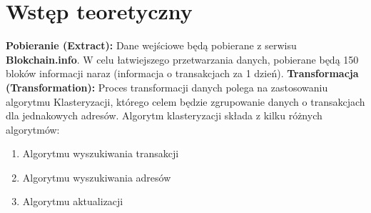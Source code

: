 \documentclass[12pt,oneside,a4paper]{book}
\begin{document}
\section{Wstęp teoretyczny}
\textbf{Pobieranie (Extract):}
\newline
Dane wejściowe będą pobierane z serwisu \textbf{Blokchain.info}.
\newline \newline
W celu łatwiejszego przetwarzania danych, pobierane będą 150 bloków informacji naraz (informacja o transakcjach za 1 dzień).
\newline \newline
\textbf{Transformacja (Transformation):}
\newline
Proces transformacji danych polega na zastosowaniu algorytmu Klasteryzacji, którego celem będzie zgrupowanie danych o transakcjach dla jednakowych adresów. Algorytm klasteryzacji składa z kilku różnych algorytmów:
\begin{enumerate}
    \item Algorytmu wyszukiwania transakcji
    \item Algorytmu wyszukiwania adresów
    \item Algorytmu aktualizacji
\end{enumerate}

\newpage
\end{document}
